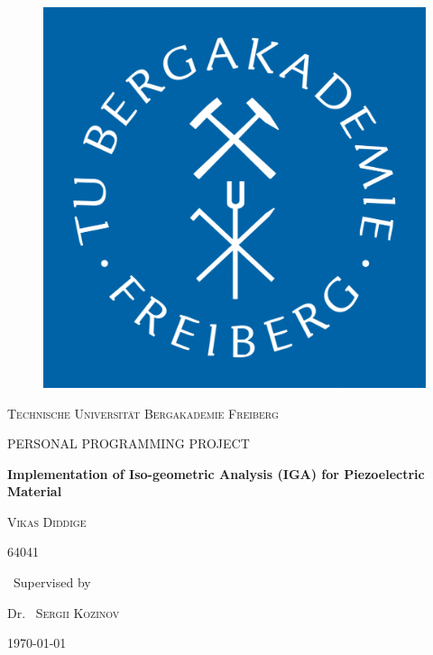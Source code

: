 \documentclass[12pt]{article}
\begin{document}
	\begin{titlepage}
		\centering
		
		\begin{figure}
			\begin{center}
				\includegraphics[scale=.2]{tubaf.pdf}  
			\end{center}
			
		\end{figure}
		
		
		
		{\scshape\LARGE Technische Universit\"at Bergakademie Freiberg \par}
		\vspace{1cm}
		{\scshape\Large PERSONAL PROGRAMMING PROJECT\par}
		\vspace{1.5cm}
		{\huge\bfseries Implementation of Iso-geometric Analysis (IGA) for Piezoelectric Material \par}
		\vspace{2cm}
		{\scshape\Large Vikas Diddige\par}
		{\scshape\Large 64041\par}
		\vfill
		{\normalsize\ Supervised by\par}
		
		Dr.~ \textsc{Sergii Kozinov}
		
		\vfill
		
		{\large \today\par}
	\end{titlepage}
	
\end{document}
